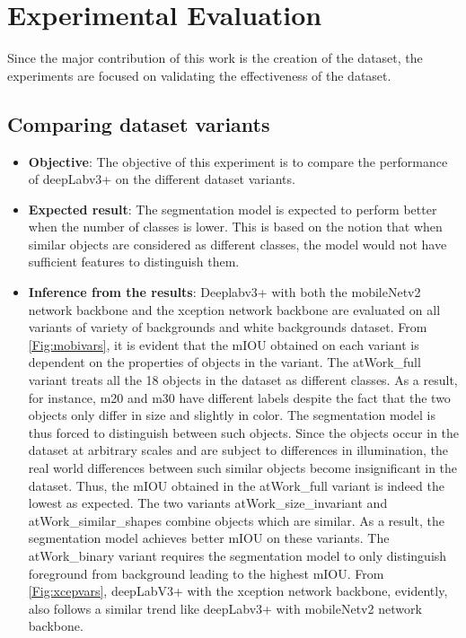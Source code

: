 
\chapter{Experimental Evaluation}

Since the major contribution of this work is the creation of the dataset, the experiments are focused on validating the effectiveness of the dataset. 


\section{Comparing dataset variants} 

	\begin{itemize}
		\item \textbf{Objective}: The objective of this experiment is to compare the performance of deepLabv3+ on the different dataset variants.
		\item \textbf{Expected result}: The segmentation model is expected to perform better when the number of classes is lower. This is based on the notion that when similar objects are considered as different classes, the model would not have sufficient features to distinguish them.
		\item \textbf{Inference from the results}: Deeplabv3+ with both the mobileNetv2 network backbone and the xception network backbone are evaluated on all variants of variety of backgrounds and white backgrounds dataset. From \ref{Fig:mobivars}, it is evident that the mIOU obtained on each variant is dependent on the properties of objects in the variant. The atWork\_full variant treats all the 18 objects in the dataset as different classes. As a result, for instance, m20 and m30 have different labels despite the fact that the two objects only differ in size and slightly in color. The segmentation model is thus forced to distinguish between such objects. Since the objects occur in the dataset at arbitrary scales and are subject to differences in illumination, the real world differences between such similar objects become insignificant in the dataset. Thus, the mIOU obtained in the atWork\_full variant is indeed the lowest as expected. The two variants atWork\_size\_invariant and atWork\_similar\_shapes combine objects which are similar. As a result, the segmentation model achieves better mIOU on these variants. The atWork\_binary variant requires the segmentation model to only distinguish foreground from background leading to the highest mIOU. From \ref{Fig:xcepvars}, deepLabV3+ with the xception network backbone, evidently, also follows a similar trend like deepLabv3+ with mobileNetv2 network backbone.
	\end{itemize}

